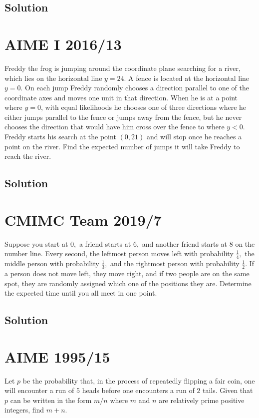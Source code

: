 \documentclass[blue,onecol]{shooting}
\begin{document}
\subsection{Solution}





\section{AIME I 2016/13} Freddy the frog is jumping around the coordinate plane searching for a river, which lies on the horizontal line $y = 24$. A fence is located at the horizontal line $y = 0$. On each jump Freddy randomly chooses a direction parallel to one of the coordinate axes and moves one unit in that direction. When he is at a point where $y=0$, with equal likelihoods he chooses one of three directions where he either jumps parallel to the fence or jumps away from the fence, but he never chooses the direction that would have him cross over the fence to where $y < 0$. Freddy starts his search at the point $(0, 21)$ and will stop once he reaches a point on the river. Find the expected number of jumps it will take Freddy to reach the river.
\subsection{Solution}





\section{CMIMC Team 2019/7} Suppose you start at $0,$ a friend starts at $6,$ and another friend starts at $8$ on the number line. Every second, the leftmost person moves left with probability $\frac{1}{4},$ the middle person with probability $\frac{1}{3},$ and the rightmost person with probability $\frac{1}{2}.$ If a person does not move left, they move right, and if two people are on the same spot, they are randomly assigned which one of the positions they are. Determine the expected time until you all meet in one point.
\subsection{Solution}    




\section{AIME 1995/15} Let $p$ be the probability that, in the process of repeatedly flipping a fair coin, one will encounter a run of $5$ heads before one encounters a run of $2$ tails. Given that $p$ can be written in the form $m/n$ where $m$ and $n$ are relatively prime positive integers, find $m+n$.
\end{document}
